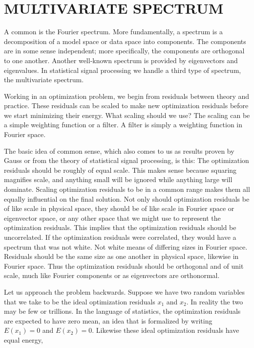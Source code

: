 \section{MULTIVARIATE SPECTRUM}
A common  is the Fourier spectrum.
More fundamentally,
a spectrum is a decomposition
of a model space or data space into components.
The components are in some sense independent; more specifically,
the components are orthogonal to one another.
Another well-known spectrum
is provided by eigenvectors and eigenvalues.
In statistical signal processing
we handle a third type of spectrum, the multivariate spectrum.
\par
Working in an optimization problem,
we begin from residuals between theory and practice.
These residuals can be scaled to make new optimization residuals
before we start minimizing their energy.
What scaling should we use?
The scaling can be a simple weighting function or a filter.
A filter is simply a weighting function in Fourier space.
\par
The basic idea of common sense,
which also comes to us
as results proven by Gauss
or from the theory of statistical signal processing,
is this:
The optimization residuals should be roughly of equal scale.
This makes sense because squaring magnifies scale,
and anything small will be ignored while anything large will dominate.
Scaling optimization residuals to be in a common range makes
them all equally influential on the final solution.
Not only should optimization residuals be of like scale in physical space,
they should be of like scale in Fourier space
or eigenvector space,
or any other space that we might use to represent the optimization residuals.
This implies that the optimization residuals should be uncorrelated.
If the optimization residuals were correlated,
they would have a spectrum that was not white.
Not white means of differing sizes in Fourier space.
Residuals should be the same size as one another in physical space,
likewise in Fourier space.
Thus the optimization residuals should be orthogonal
and of unit scale, much like Fourier components
or as eigenvectors are orthonormal.
\par
Let us approach the problem backwards.
Suppose we have two random variables
that we take to be the ideal optimization residuals $x_1$ and $x_2$.
In reality the two may be few or trillions.
In the language of statistics,
the optimization residuals are expected to have zero mean,
an idea that is formalized by writing
$E(x_1)=0$
and 
$E(x_2)=0$.
Likewise these ideal optimization residuals have equal energy,
